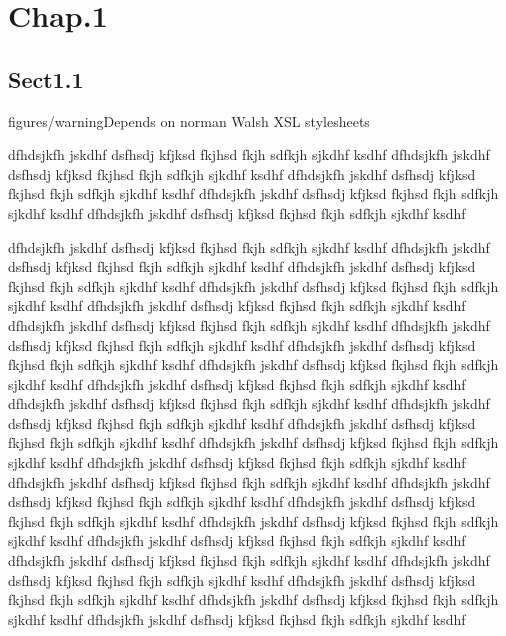 
\chapter{Chap.1}
\label{outputchap1}\hypertarget{outputchap1}{}%

\section{Sect1.1}
\label{id2717267}\hypertarget{id2717267}{}%

\begin{admonition}{figures/warning}{Depends on norman Walsh XSL stylesheets}%

dfhdsjkfh jskdhf dsfhsdj kfjksd fkjhsd fkjh sdfkjh sjkdhf ksdhf
        dfhdsjkfh jskdhf dsfhsdj kfjksd fkjhsd fkjh sdfkjh sjkdhf ksdhf
        dfhdsjkfh jskdhf dsfhsdj kfjksd fkjhsd fkjh sdfkjh sjkdhf ksdhf
        dfhdsjkfh jskdhf dsfhsdj kfjksd fkjhsd fkjh sdfkjh sjkdhf ksdhf
        dfhdsjkfh jskdhf dsfhsdj kfjksd fkjhsd fkjh sdfkjh sjkdhf
        ksdhf
\end{admonition}


dfhdsjkfh jskdhf dsfhsdj kfjksd fkjhsd fkjh sdfkjh sjkdhf ksdhf
      dfhdsjkfh jskdhf dsfhsdj kfjksd fkjhsd fkjh sdfkjh sjkdhf ksdhf
      dfhdsjkfh jskdhf dsfhsdj kfjksd fkjhsd fkjh sdfkjh sjkdhf ksdhf
      dfhdsjkfh jskdhf dsfhsdj kfjksd fkjhsd fkjh sdfkjh sjkdhf ksdhf
      dfhdsjkfh jskdhf dsfhsdj kfjksd fkjhsd fkjh sdfkjh sjkdhf ksdhf
      dfhdsjkfh jskdhf dsfhsdj kfjksd fkjhsd fkjh sdfkjh sjkdhf ksdhf
      dfhdsjkfh jskdhf dsfhsdj kfjksd fkjhsd fkjh sdfkjh sjkdhf ksdhf
      dfhdsjkfh jskdhf dsfhsdj kfjksd fkjhsd fkjh sdfkjh sjkdhf ksdhf
      dfhdsjkfh jskdhf dsfhsdj kfjksd fkjhsd fkjh sdfkjh sjkdhf ksdhf
      dfhdsjkfh jskdhf dsfhsdj kfjksd fkjhsd fkjh sdfkjh sjkdhf ksdhf
      dfhdsjkfh jskdhf dsfhsdj kfjksd fkjhsd fkjh sdfkjh sjkdhf ksdhf
      dfhdsjkfh jskdhf dsfhsdj kfjksd fkjhsd fkjh sdfkjh sjkdhf ksdhf
      dfhdsjkfh jskdhf dsfhsdj kfjksd fkjhsd fkjh sdfkjh sjkdhf ksdhf
      dfhdsjkfh jskdhf dsfhsdj kfjksd fkjhsd fkjh sdfkjh sjkdhf ksdhf
      dfhdsjkfh jskdhf dsfhsdj kfjksd fkjhsd fkjh sdfkjh sjkdhf ksdhf
      dfhdsjkfh jskdhf dsfhsdj kfjksd fkjhsd fkjh sdfkjh sjkdhf ksdhf
      dfhdsjkfh jskdhf dsfhsdj kfjksd fkjhsd fkjh sdfkjh sjkdhf ksdhf
      dfhdsjkfh jskdhf dsfhsdj kfjksd fkjhsd fkjh sdfkjh sjkdhf ksdhf
      dfhdsjkfh jskdhf dsfhsdj kfjksd fkjhsd fkjh sdfkjh sjkdhf ksdhf
      dfhdsjkfh jskdhf dsfhsdj kfjksd fkjhsd fkjh sdfkjh sjkdhf ksdhf
      dfhdsjkfh jskdhf dsfhsdj kfjksd fkjhsd fkjh sdfkjh sjkdhf ksdhf
      dfhdsjkfh jskdhf dsfhsdj kfjksd fkjhsd fkjh sdfkjh sjkdhf ksdhf
      dfhdsjkfh jskdhf dsfhsdj kfjksd fkjhsd fkjh sdfkjh sjkdhf ksdhf
      dfhdsjkfh jskdhf dsfhsdj kfjksd fkjhsd fkjh sdfkjh sjkdhf ksdhf
      dfhdsjkfh jskdhf dsfhsdj kfjksd fkjhsd fkjh sdfkjh sjkdhf ksdhf
